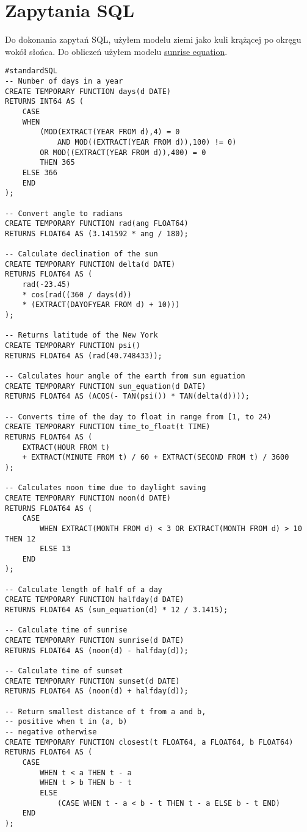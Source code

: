 \documentclass{article}
\begin{document}
\newpage
\section*{Zapytania SQL}
Do dokonania zapytań SQL, użyłem modelu ziemi jako kuli krążącej po okręgu wokół słońca. Do obliczeń użyłem modelu \href{https://en.wikipedia.org/wiki/Sunrise_equation}{sunrise equation}.
\begin{verbatim}
#standardSQL
-- Number of days in a year
CREATE TEMPORARY FUNCTION days(d DATE)
RETURNS INT64 AS (
    CASE
    WHEN 
        (MOD(EXTRACT(YEAR FROM d),4) = 0 
            AND MOD((EXTRACT(YEAR FROM d)),100) != 0)
        OR MOD((EXTRACT(YEAR FROM d)),400) = 0 
        THEN 365
    ELSE 366
    END
);

-- Convert angle to radians
CREATE TEMPORARY FUNCTION rad(ang FLOAT64)
RETURNS FLOAT64 AS (3.141592 * ang / 180);

-- Calculate declination of the sun
CREATE TEMPORARY FUNCTION delta(d DATE)
RETURNS FLOAT64 AS (
    rad(-23.45)
    * cos(rad((360 / days(d))
    * (EXTRACT(DAYOFYEAR FROM d) + 10)))
);

-- Returns latitude of the New York
CREATE TEMPORARY FUNCTION psi()
RETURNS FLOAT64 AS (rad(40.748433));

-- Calculates hour angle of the earth from sun eguation
CREATE TEMPORARY FUNCTION sun_equation(d DATE)
RETURNS FLOAT64 AS (ACOS(- TAN(psi()) * TAN(delta(d))));

-- Converts time of the day to float in range from [1, to 24)
CREATE TEMPORARY FUNCTION time_to_float(t TIME)
RETURNS FLOAT64 AS (
    EXTRACT(HOUR FROM t) 
    + EXTRACT(MINUTE FROM t) / 60 + EXTRACT(SECOND FROM t) / 3600
);

-- Calculates noon time due to daylight saving
CREATE TEMPORARY FUNCTION noon(d DATE)
RETURNS FLOAT64 AS (
    CASE
        WHEN EXTRACT(MONTH FROM d) < 3 OR EXTRACT(MONTH FROM d) > 10 THEN 12
        ELSE 13
    END
);

-- Calculate length of half of a day
CREATE TEMPORARY FUNCTION halfday(d DATE)
RETURNS FLOAT64 AS (sun_equation(d) * 12 / 3.1415);

-- Calculate time of sunrise
CREATE TEMPORARY FUNCTION sunrise(d DATE)
RETURNS FLOAT64 AS (noon(d) - halfday(d));

-- Calculate time of sunset
CREATE TEMPORARY FUNCTION sunset(d DATE)
RETURNS FLOAT64 AS (noon(d) + halfday(d));

-- Return smallest distance of t from a and b,
-- positive when t in (a, b) 
-- negative otherwise
CREATE TEMPORARY FUNCTION closest(t FLOAT64, a FLOAT64, b FLOAT64)
RETURNS FLOAT64 AS (
    CASE
        WHEN t < a THEN t - a
        WHEN t > b THEN b - t
        ELSE 
            (CASE WHEN t - a < b - t THEN t - a ELSE b - t END)
    END
);
\end{verbatim}
\end{document}
